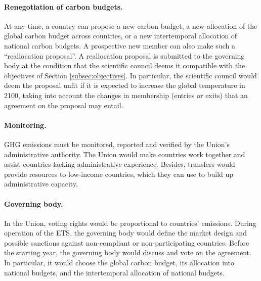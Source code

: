 \documentclass[12pt,english]{article}
\begin{document}
\paragraph{Renegotiation of carbon budgets.}
At any time, a country can propose a new carbon budget, a new allocation of the global carbon budget across countries, or a new intertemporal allocation of national carbon budgets. A prospective new member can also make such a ``reallocation proposal''. A reallocation proposal is submitted to the governing body at the condition that the scientific council deems it compatible with the objectives of Section \ref{subsec:objectives}. In particular, the scientific council would deem the proposal unfit if it is expected to increase the global temperature in 2100, taking into account the changes in membership (entries or exits) that an agreement on the proposal may entail.


\paragraph{Monitoring.}
GHG emissions must be monitored, reported and verified by the Union's administrative authority. The Union would make countries work together and assist countries lacking administrative experience. Besides, transfers would provide resources to low-income countries, which they can use to build up administrative capacity. 

\paragraph{Governing body.} 
In the Union, voting rights would be proportional to countries' emissions. %
During operation of the ETS, the governing body would define the market design and possible sanctions against non-compliant or non-participating countries.  %
Before the starting year, the governing body would discuss and vote on the agreement. In particular, it would choose the global carbon budget, its allocation into national budgets, and the intertemporal allocation of national budgets. 
\end{document}
